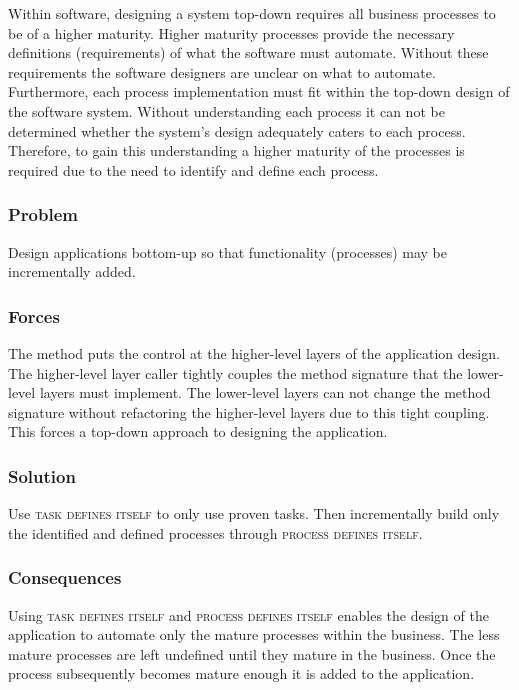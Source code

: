 \documentclass[prodmode]{style/acmlarge}
\begin{document}
Within software, designing a system top-down requires all business processes to
be of a higher maturity.  Higher maturity processes provide the necessary
definitions (requirements) of what the software must automate.  Without these
requirements the software designers are unclear on what to automate.
Furthermore, each process implementation must fit within the top-down design of
the software system.  Without understanding each process it can not be
determined whether the system's design adequately caters to each process.
Therefore, to gain this understanding a higher maturity of the processes is
required due to the need to identify and define each process.

\subsubsection*{\textbf{Problem}} Design applications bottom-up so that
functionality (processes) may be incrementally added.

\subsubsection*{Forces} The method puts the control at the higher-level layers
of the application design.  The higher-level layer caller tightly couples the
method signature that the lower-level layers must implement.  The lower-level
layers can not change the method signature without refactoring the higher-level
layers due to this tight coupling.  This forces a top-down approach to designing
the application.

\subsubsection*{\textbf{Solution}} Use \textsc{task defines itself} to only use
proven tasks.  Then incrementally build only the identified and defined
processes through \textsc{process defines itself}.

\subsubsection*{Consequences} Using \textsc{task defines itself} and
\textsc{process defines itself} enables the design of the application to
automate only the mature processes within the business.  The less mature
processes are left undefined until they mature in the business.  Once the
process subsequently becomes mature enough it is added to the application.
\end{document}

